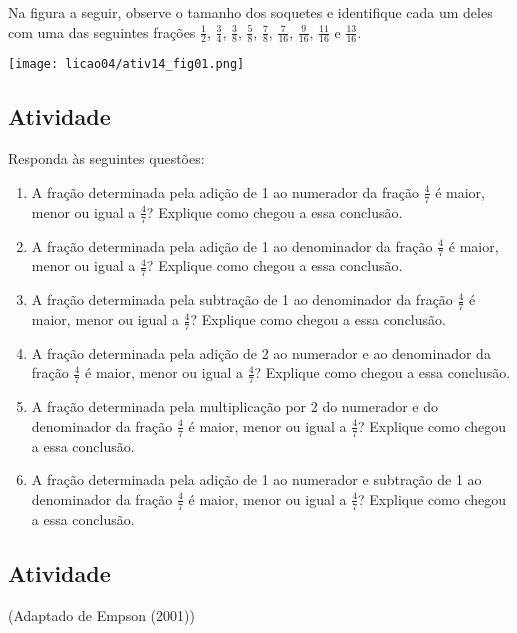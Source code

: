 Na figura a seguir, observe o tamanho dos soquetes e identifique cada um deles com uma das seguintes frações $\frac{1}{2}$, $\frac{3}{4}$, $\frac{3}{8}$, $\frac{5}{8}$, $\frac{7}{8}$, $\frac{7}{16}$, $\frac{9}{16}$, $\frac{11}{16}$ e $\frac{13}{16}$.

\begin{center}
    \texttt{[image: licao04/ativ14\_fig01.png]}
\end{center}

\subsection{Atividade}

Responda às seguintes questões:

\begin{enumerate} [\quad a)] %
  \item     A fração determinada pela adição de 1 ao numerador da fração     $\frac{4}{7}$ é maior, menor ou igual a     $\frac{4}{7}$? Explique como chegou a essa conclusão.
  \item     A fração determinada pela adição de 1 ao denominador da fração     $\frac{4}{7}$ é maior, menor ou igual a     $\frac{4}{7}$? Explique como chegou a essa conclusão.
  \item     A fração determinada pela subtração de 1 ao denominador da fração     $\frac{4}{7}$ é maior, menor ou igual a     $\frac{4}{7}$? Explique como chegou a essa conclusão.
  \item     A fração determinada pela adição de 2 ao numerador e ao denominador da fração     $\frac{4}{7}$ é maior, menor ou igual a     $\frac{4}{7}$? Explique como chegou a essa conclusão.
  \item     A fração determinada pela multiplicação por 2 do numerador e do denominador da fração     $\frac{4}{7}$ é maior, menor ou igual a     $\frac{4}{7}$? Explique como chegou a essa conclusão.
  \item     A fração determinada pela adição de 1 ao numerador e subtração de 1 ao denominador da fração     $\frac{4}{7}$ é maior, menor ou igual a     $\frac{4}{7}$? Explique como chegou a essa conclusão.
\end{enumerate} %

\subsection{Atividade}


(Adaptado de Empson (2001))

